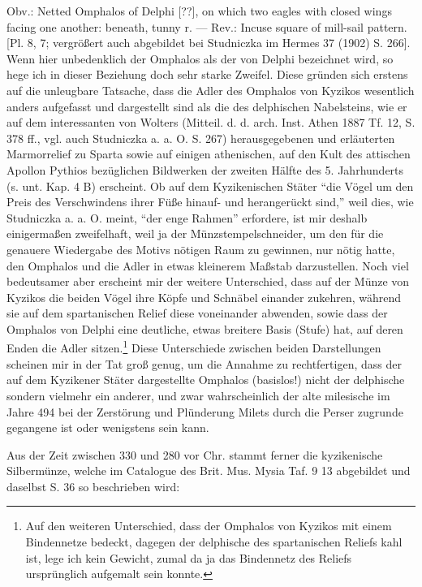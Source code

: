 \documentclass[a4paper, 11pt, oneside]{article}
\begin{document}
Obv.: Netted Omphalos of Delphi [??], on which two eagles with closed wings facing one another: beneath, tunny r. --- Rev.: Incuse square of mill-sail pattern. [Pl. 8, 7; vergrößert auch abgebildet bei Studniczka im Hermes 37 (1902) S. 266]. Wenn hier unbedenklich der Omphalos als der von Delphi bezeichnet wird, so hege ich in dieser Beziehung doch sehr starke Zweifel. Diese gründen sich erstens auf die unleugbare Tatsache, dass die Adler des Omphalos von Kyzikos wesentlich anders aufgefasst und dargestellt sind als die des delphischen Nabelsteins, wie er auf dem interessanten von Wolters (Mitteil. d. d. arch. Inst. Athen 1887 Tf. 12, S. 378 ff., vgl. auch Studniczka a. a. O. S. 267) herausgegebenen und erläuterten Marmorrelief zu Sparta sowie auf einigen athenischen, auf den Kult des attischen Apollon Pythios bezüglichen Bildwerken der zweiten Hälfte des 5. Jahrhunderts (s. unt. Kap. 4 B) erscheint. Ob auf dem Kyzikenischen Stäter "`die Vögel um den Preis des Verschwindens ihrer Füße hinauf- und herangerückt sind,"' weil dies, wie Studniczka a. a. O. meint, "`der enge Rahmen"' erfordere, ist mir deshalb einigermaßen zweifelhaft, weil ja der Münzstempelschneider, um den für die genauere Wiedergabe des Motivs nötigen Raum zu gewinnen, nur nötig hatte, den Omphalos und die Adler in etwas kleinerem Maßstab darzustellen. Noch viel bedeutsamer aber erscheint mir der weitere Unterschied, dass auf der Münze von Kyzikos die beiden Vögel ihre Köpfe und Schnäbel einander zukehren, während sie auf dem spartanischen Relief diese voneinander abwenden, sowie dass der Omphalos von Delphi eine deutliche, etwas breitere Basis (Stufe) hat, auf deren Enden die Adler sitzen.\footnote{Auf den weiteren Unterschied, dass der Omphalos von Kyzikos mit einem Bindennetze bedeckt, dagegen der delphische des spartanischen Reliefs kahl ist, lege ich kein Gewicht, zumal da ja das Bindennetz des Reliefs ursprünglich aufgemalt sein konnte.} Diese Unterschiede zwischen beiden Darstellungen scheinen mir in der Tat groß genug, um die Annahme zu rechtfertigen, dass der auf dem Kyzikener Stäter dargestellte Omphalos (basislos!) nicht der delphische sondern vielmehr ein anderer, und zwar wahrscheinlich der alte milesische im Jahre 494 bei der Zerstörung und Plünderung Milets durch die Perser zugrunde gegangene ist oder wenigstens sein kann.

Aus der Zeit zwischen 330 und 280 vor Chr. stammt ferner die kyzikenische Silbermünze, welche im Catalogue des Brit. Mus. Mysia Taf. 9 13 abgebildet und daselbst S. 36 so beschrieben wird:
\end{document}
